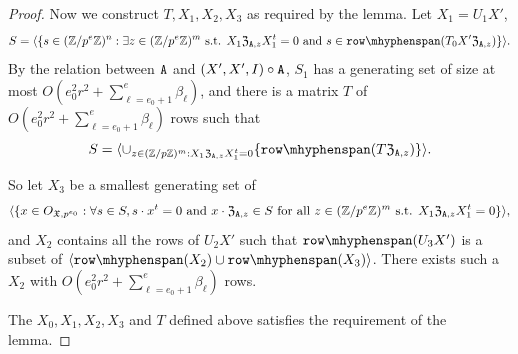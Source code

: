 \begin{proof}
Now we construct $T, X_1, X_2, X_3$ as required by the lemma. 
Let %
$X_1 = U_1 X'$, 
\[S =  \langle \{ s \in (\Z / p^e \Z)^n : \exists z \in (\Z / p^e \Z)^m \text{ s.t. } X_1 \mathfrak{Z}_{\tA, z} X_1^t = 0 \text{ and } s \in \rowspan(T_0 X' \mathfrak{Z}_{\tA, z})\} \rangle. \]
By the relation between $\mathtt{A}$ and $(X', X', I) \circ \mathtt{A}$, 
$S_1$ has a generating set of size at most $O(e_0^2 r^2 + \sum_{\ell = e_0 + 1}^e \beta_{\ell})$, and there is a matrix $T$ of $O(e_0^2 r^2 + \sum_{\ell = e_0 + 1}^e \beta_{\ell})$ rows such that 
\[S = \langle \cup_{z \in (\Z / p\Z)^m : X_1 \mathfrak{Z}_{\tA, z}X_1^t = 0}\{\rowspan(T \mathfrak{Z}_{\tA, z})\}\rangle.\]

So let $X_3$ be a smallest generating set of 
\[\langle \{x \in O_{\mathfrak{X}, p^{e_0}} : \forall s \in S, s \cdot x^t = 0 \text{ and } x \cdot \mathfrak{Z}_{ \mathtt{A}, z} \in S  \text{ for all } 
z \in (\mathbb{Z} / p^e \mathbb{Z})^m \text{ s.t. }  X_1 \mathfrak{Z}_{\mathtt{A}, z} X_1^t = 0\}\rangle,\]
and $X_2$ contains all the rows of $U_2 X'$ such that $\rowspan(U_3X')$ is a subset of $\langle \rowspan(X_2) \cup \rowspan(X_3)\rangle$.
There exists such a $X_2$ with $O(e_0^2r^2 + \sum_{\ell = e_0 + 1}^e \beta_\ell)$ rows. 
 


The $X_0, X_1, X_2, X_3$ and $T$ defined above satisfies the requirement of the lemma. 

\end{proof}
